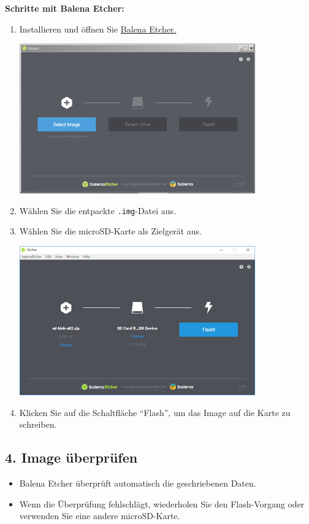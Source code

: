 \documentclass{article}
\begin{document}
\textbf{Schritte mit Balena Etcher:}
\begin{enumerate}
    \item Installieren und öffnen Sie \textcolor{blue}{\href{https://etcher.balena.io/}{Balena Etcher.}}
    \begin{center}
        \includegraphics[width=0.8\textwidth ]{Etcher.png}
    \end{center}
    \item Wählen Sie die entpackte \texttt{.img}-Datei aus.
    \item Wählen Sie die microSD-Karte als Zielgerät aus.
    \begin{center}
        \includegraphics[width=0.8\textwidth ]{Etcher_Select_Drive.png}
    \end{center}
    \item Klicken Sie auf die Schaltfläche \textquotedblleft Flash\textquotedblright, um das Image auf die Karte zu schreiben.
\end{enumerate}

\subsection{4. Image überprüfen}
\begin{itemize}
    \item Balena Etcher überprüft automatisch die geschriebenen Daten.
    \item Wenn die Überprüfung fehlschlägt, wiederholen Sie den Flash-Vorgang oder verwenden Sie eine andere microSD-Karte.
\end{itemize}
\end{document}
